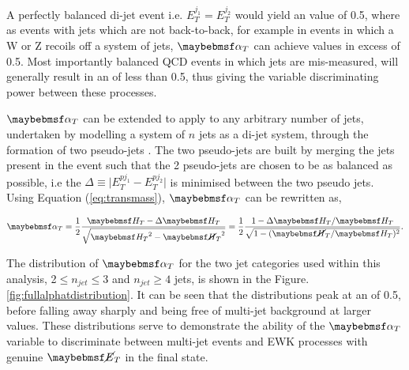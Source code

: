 A perfectly balanced di-jet event i.e. $E_{T}^{j_{1}} = E_{T}^{j_{2}}$ would yield an \alphat value of 0.5, where as events with jets which are not back-to-back, for example in events in which a W or Z recoils off a system of jets, $\alphat$ can achieve values in excess of 0.5. Most importantly balanced QCD events in which jets are mis-measured, will generally result in an \alphat of less than 0.5, thus giving the \alphat variable discriminating power between these processes.

$\alphat$ can be extended to apply to any arbitrary number of jets, undertaken by modelling a system of $n$ jets as a di-jet system, through the formation of two pseudo-jets \cite{CMS-PAS-SUS-09-001}. The two pseudo-jets are built by merging the jets present in the event such that the 2 pseudo-jets are chosen to be as balanced as possible, i.e the $\Delta$\theht $\equiv \lvert E_{T}^{pj_{1}} - E_{T}^{pj_{2}}\rvert$ is minimised between the two pseudo jets. Using Equation (\ref{eq:transmass}), $\alphat$ can be rewritten as,

\begin{equation}
\label{eq:alphatmht}
\alphat = \frac{1}{2} \frac {\theht - \Delta\theht}{\sqrt{\theht^{2}-\mht^{2}}}= \frac{1}{2}\frac{1-\Delta\theht/\theht}{\sqrt{1-(\mht/\theht)^{2}}}.
\end{equation}

The distribution of $\alphat$ for the two jet categories used within this analysis, 2$\leq n_{jet} \leq$3 and $ n_{jet} \geq 4$ jets, is shown in the Figure.\ref{fig:fullalphatdistribution}. It can be seen that the distributions peak at an \alphat of 0.5, before falling away sharply and being free of multi-jet background at larger \alphat values. These distributions serve to demonstrate the ability of the $\alphat$ variable to discriminate between multi-jet events and \ac{EWK} processes with genuine $\met$ in the final state. 


